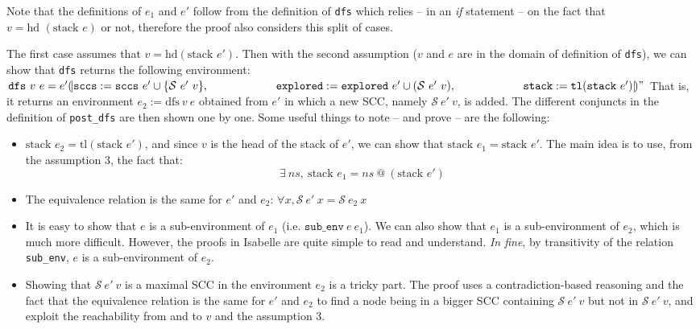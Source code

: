 \documentclass[a4 paper, 12pt]{article}
\begin{document}
{\BlankLine
\BlankLine

Note that the definitions of $e_1$ and $e'$ follow from the definition of \texttt{dfs} which relies -- in an \textit{if} statement -- on the fact that $v = \text{hd } (\text{stack } e)$ or not, therefore the proof also considers this split of cases.

\BlankLine

The first case assumes that $v = \text{hd}(\text{stack }e')$. Then with the second assumption ($v$ and $e$ are in the domain of definition of \texttt{dfs}), we can show that \texttt{dfs} returns the following environment:
\BlankLine
\noindent
$\texttt{dfs}~v~e = e'(\!|\texttt{sccs}:=\texttt{sccs}~e' \cup \{\mathcal{S}~e'~v\},\\
~~~~~~~~~~~~~~~~~~\texttt{explored}:=\texttt{explored}~e' \cup (\mathcal{S}~e'~v),\\
~~~~~~~~~~~~~~~~~~\texttt{stack}:=\texttt{tl}(\texttt{stack}~e')|\!)"$
\BlankLine
That is, it returns an environment $e_2 := \text{dfs}~v~e$ obtained from $e'$ in which a new SCC, namely $\mathcal{S}~e'~v$, is added. The different conjuncts in the definition of \texttt{post\_dfs} are then shown one by one. Some useful things to note -- and prove -- are the following:

\begin{itemize}
    \item $\text{stack }e_2 = \text{tl}(\text{stack }e')$, and since $v$ is the head of the stack of $e'$, we can show that $\text{stack }e_1 = \text{stack }e'$. The main idea is to use, from the assumption 3, the fact that:
    \begin{equation*}
        \exists~ns,~\text{stack } e_1 = ns~@~(\text{stack }e')
    \end{equation*}

    \item The equivalence relation is the same for $e'$ and $e_2$: $\forall x, \mathcal{S}~e'~x = \mathcal{S}~e_2~x$
    \item It is easy to show that $e$ is a sub-environment of $e_1$ (i.e. $\texttt{sub\_env}~e~e_1$). We can also show that $e_1$ is a sub-environment of $e_2$, which is much more difficult. However, the proofs in Isabelle are quite simple to read and understand. \textit{In fine}, by transitivity of the relation \texttt{sub\_env}, $e$ is a sub-environment of $e_2$.
    \item Showing that $\mathcal{S}~e'~v$ is a maximal SCC in the environment $e_2$ is a tricky part. The proof uses a contradiction-based reasoning and the fact that the equivalence relation is the same for $e'$ and $e_2$ to find a node being in a bigger SCC containing $\mathcal{S}~e'~v$ but not in $\mathcal{S}~e'~v$, and exploit the reachability from and to $v$ and the assumption 3.
\end{itemize}

}
\end{document}
